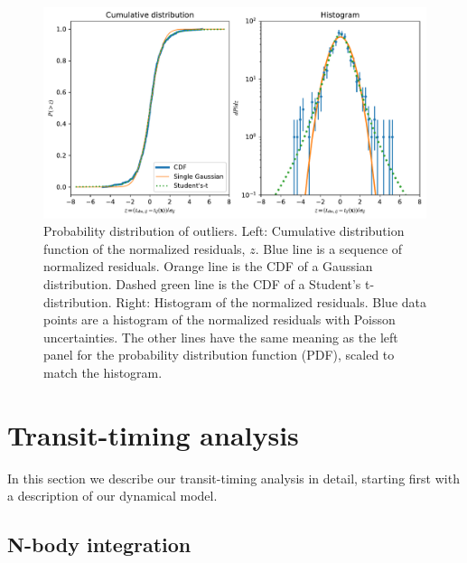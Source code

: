 \documentclass[twocolumn]{aastex63}
\begin{document}

\begin{figure}
    \centering
    \includegraphics[width=\hsize]{figures/Students_t_optimized.pdf}
    \caption{Probability distribution of outliers.  Left:  Cumulative distribution 
    function of the normalized residuals, $z$.  Blue line is a sequence of normalized residuals. 
    Orange line is the CDF of a Gaussian distribution. %
    Dashed green line is the CDF of a Student's t- 
    distribution.  Right: Histogram of the normalized residuals.  Blue data points 
    are a histogram of the normalized residuals with Poisson uncertainties.  The other lines 
    have the same meaning as the left panel for the probability distribution function 
    (PDF),  scaled to match the histogram.}
    \label{fig:timing_residuals}
\end{figure}

\section{Transit-timing analysis} \label{sec:transit_timing}

In this section we describe our transit-timing analysis in detail, starting first with a description of our dynamical model.




\subsection{N-body integration}
\end{document}
